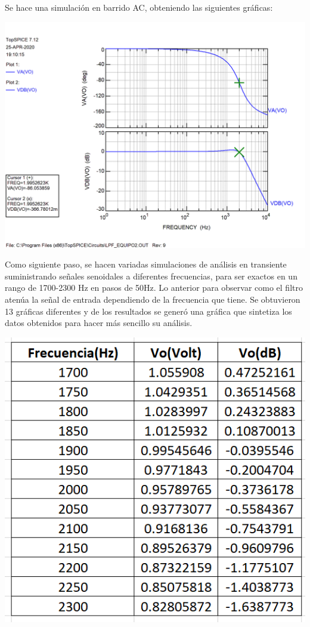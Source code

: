 \documentclass[12pt]{article}
\begin{document}
Se hace una simulación en barrido AC, obteniendo las siguientes gráficas:
\begin{center}
    \centering
    \includegraphics[scale=0.2]{LPF_Equipo2.png}
\end{center}
Como siguiente paso, se hacen variadas simulaciones de análisis en transiente suministrando señales senoidales a diferentes frecuencias, para ser exactos en un rango de 1700-2300 Hz en pasos de 50Hz. Lo anterior para observar como el filtro atenúa la señal de entrada dependiendo de la frecuencia que tiene. Se obtuvieron 13 gráficas diferentes y de los resultados se generó una gráfica que sintetiza los datos obtenidos para hacer más sencillo su análisis.
\begin{center}
    \centering
    \includegraphics[scale=0.6]{Tabla_dbcalc.png}
\end{center}
\end{document}

